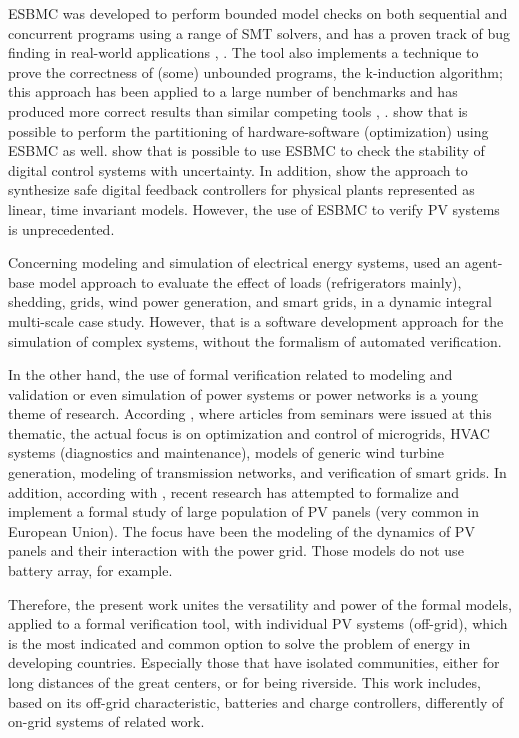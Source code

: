 \documentclass[journal]{IEEEtran}
\begin{document}
ESBMC was developed to perform bounded model checks on both sequential and concurrent programs using a range of SMT solvers, and has a proven track of bug finding in real-world applications \cite{Cordeiro}, \cite{Ramalho}. The tool also implements a technique to prove the correctness of (some) unbounded programs, the k-induction algorithm; this approach has been applied to a large number of benchmarks and has produced more correct results than similar competing tools \cite{GadelhaSBMF}, \cite{GadelhaK}. \cite{Trindade} show that is possible to perform the partitioning of hardware-software (optimization) using ESBMC as well. \cite{Bessa} show that is possible to use ESBMC to check the stability of digital control systems with uncertainty. In addition, \cite{Abateetal2017} show the approach to synthesize safe digital feedback controllers for physical plants represented as linear, time invariant models. However, the use of ESBMC to verify PV systems is unprecedented. 

Concerning modeling and simulation of electrical energy systems, \cite{Kremers} used an agent-base model approach to evaluate the effect of loads (refrigerators mainly), shedding, grids, wind power generation, and smart grids, in a dynamic integral multi-scale case study. However, that is a software development approach for the simulation of complex systems, without the formalism of automated verification. 

In the other hand, the use of formal verification related to modeling and validation or even simulation of power systems or power networks is a young theme of research. According \cite{Abateetal2014}, where articles from seminars were issued at this thematic, the actual focus is on optimization and control of microgrids, HVAC systems (diagnostics and maintenance), models of generic wind turbine generation, modeling of transmission networks, and verification of smart grids. In addition, according with \cite{Abate2017}, recent research has attempted to formalize and implement a formal study of large population of PV panels (very common in European Union). The focus have been the modeling of the dynamics of PV panels and their interaction with the power grid. Those models do not use battery array, for example. 

Therefore, the present work unites the versatility and power of the formal models, applied to a formal verification tool, with individual PV systems (off-grid), which is the most indicated and common option to solve the problem of energy in developing countries. Especially those that have isolated communities, either for long distances of the great centers, or for being riverside. This work includes, based on its off-grid characteristic, batteries and charge controllers, differently of on-grid systems of related work. 
\end{document}
